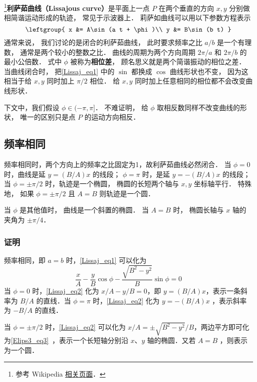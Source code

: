 


\footnote{参考 Wikipedia \href{https://en.wikipedia.org/wiki/Lissajous_curve}{相关页面}．}\textbf{利萨茹曲线（Lissajous curve）}是平面上一点 $P$ 在两个垂直的方向 $x, y$ 分别做相简谐运动形成的轨迹， 常见于示波器上． 莉萨如曲线可以用以下参数方程表示
\begin{equation}\label{Lissaj_eq1}
\leftgroup{
x &= A\sin(a t + \phi)\\
y &= B\sin(b t)
}\end{equation}
通常来说， 我们讨论的是闭合的利萨茹曲线， 此时要求频率之比 $a/b$ 是一个有理数， 通常是两个较小的整数之比． 曲线的周期为两个方向周期 $2\pi/a$ 和 $2\pi/b$ 的最小公倍数． 式中 $\phi$ 被称为\textbf{相位差}， 顾名思义就是两个简谐振动的相位之差． 当曲线闭合时， 把\autoref{Lissaj_eq1} 中的 $\sin$ 都换成 $\cos$ 曲线形状也不变， 因为这相当于给 $x, y$ 同时加上 $\pi/2$ 相位． 给 $x, y$ 同时加上任意相同的相位都不会改变曲线形状．

下文中，我们假设 $\phi \in (-\pi, \pi]$． 不难证明， 给 $\phi$ 取相反数同样不改变曲线的形状， 唯一的区别只是点 $P$ 的运动方向相反．

\subsection{频率相同}
频率相同时，两个方向上的频率之比固定为1，故利萨茹曲线必然闭合．
当 $\phi = 0$ 时，曲线是延 $y=(B/A)x$ 的线段； $\phi = \pi$ 时，是延 $y=-(B/A)x$ 的线段； 当 $\phi = \pm\pi/2$ 时，轨迹是一个椭圆， 椭圆的长短两个轴与 $x,y$ 坐标轴平行． 特殊地， 如果 $\phi = \pm\pi/2$ 且 $A = B$ 则轨迹是一个圆．

当 $\phi$ 是其他值时， 曲线是一个斜置的椭圆． 当 $A = B$ 时， 椭圆长轴与 $x$ 轴的夹角为 $\pm\pi/4$．
\subsubsection{证明}
频率相同，即 $a=b$ 时，\autoref{Lissaj_eq1} 可以化为
\begin{equation}\label{Lissaj_eq2}
\frac xA-\frac yB\cos\phi-\frac{\sqrt{B^2-y^2}}{B}\sin\phi=0
\end{equation}
当 $\phi=0$ 时，\autoref{Lissaj_eq2} 化为 $x/A-y/B=0$，即 $y=(B/A)x$，表示一条斜率为 $B/A$ 的直线．当 $\phi=\pi$ 时，\autoref{Lissaj_eq2} 化为 $y=-(B/A)x$ ，表示斜率为 $-B/A$ 的直线．

当 $\phi=\pm\pi/2$ 时，\autoref{Lissaj_eq2} 可以化为 $x/A=\pm\sqrt{B^2-y^2}/B$，两边平方即可化为\autoref{Elips3_eq3}~，表示一个长短轴分别沿 $x$、$y$ 轴的椭圆．又若 $A=B$ ，则表示为一个圆．

